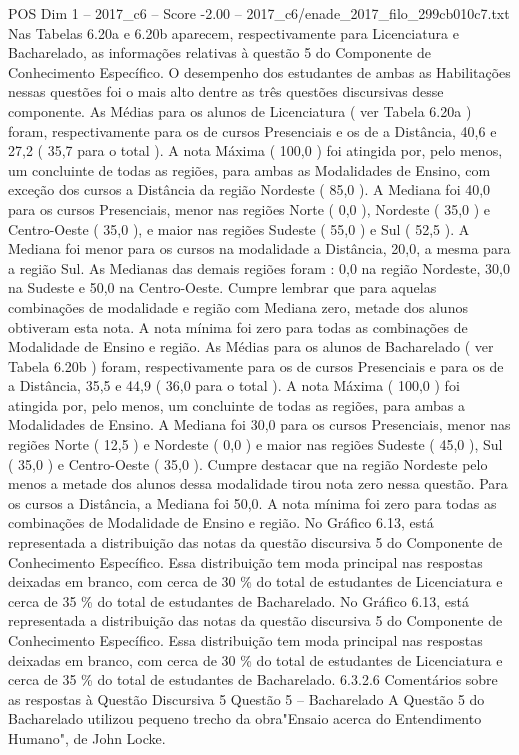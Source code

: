 \begin{textsample}{POS Dim 1 – 2017\_c6 – Score -2.00 – 2017\_c6/enade\_2017\_filo\_299cb010c7.txt}
Nas Tabelas 6.20a e 6.20b aparecem, respectivamente para Licenciatura e Bacharelado, as informações relativas à questão 5 do Componente de Conhecimento Específico.
O desempenho dos estudantes de ambas as Habilitações nessas questões foi o mais alto dentre as três questões discursivas desse componente.
As Médias para os alunos de Licenciatura ( ver Tabela 6.20a ) foram, respectivamente para os de cursos Presenciais e os de a Distância, 40,6 e 27,2 ( 35,7 para o total ).
A nota Máxima ( 100,0 ) foi atingida por, pelo menos, um concluinte de todas as regiões, para ambas as Modalidades de Ensino, com exceção dos cursos a Distância da região Nordeste ( 85,0 ).
A Mediana foi 40,0 para os cursos Presenciais, menor nas regiões Norte ( 0,0 ), Nordeste ( 35,0 ) e Centro-Oeste ( 35,0 ), e maior nas regiões Sudeste ( 55,0 ) e Sul ( 52,5 ).
A Mediana foi menor para os cursos na modalidade a Distância, 20,0, a mesma para a região Sul.
As Medianas das demais regiões foram : 0,0 na região Nordeste, 30,0 na Sudeste e 50,0 na Centro-Oeste.
Cumpre lembrar que para aquelas combinações de modalidade e região com Mediana zero, metade dos alunos obtiveram esta nota.
A nota mínima foi zero para todas as combinações de Modalidade de Ensino e região.
As Médias para os alunos de Bacharelado ( ver Tabela 6.20b ) foram, respectivamente para os de cursos Presenciais e para os de a Distância, 35,5 e 44,9 ( 36,0 para o total ).
A nota Máxima ( 100,0 ) foi atingida por, pelo menos, um concluinte de todas as regiões, para ambas a Modalidades de Ensino.
A Mediana foi 30,0 para os cursos Presenciais, menor nas regiões Norte ( 12,5 ) e Nordeste ( 0,0 ) e maior nas regiões Sudeste ( 45,0 ), Sul ( 35,0 ) e Centro-Oeste ( 35,0 ).
Cumpre destacar que na região Nordeste pelo menos a metade dos alunos dessa modalidade tirou nota zero nessa questão.
Para os cursos a Distância, a Mediana foi 50,0.
A nota mínima foi zero para todas as combinações de Modalidade de Ensino e região.
No Gráfico 6.13, está representada a distribuição das notas da questão discursiva 5 do Componente de Conhecimento Específico.
Essa distribuição tem moda principal nas respostas deixadas em branco, com cerca de 30 \% do total de estudantes de Licenciatura e cerca de 35 \% do total de estudantes de Bacharelado.
No Gráfico 6.13, está representada a distribuição das notas da questão discursiva 5 do Componente de Conhecimento Específico.
Essa distribuição tem moda principal nas respostas deixadas em branco, com cerca de 30 \% do total de estudantes de Licenciatura e cerca de 35 \% do total de estudantes de Bacharelado. 6.3.2.6 Comentários sobre as respostas à Questão Discursiva 5 Questão 5 – Bacharelado A Questão 5 do Bacharelado utilizou pequeno trecho da obra"Ensaio acerca do Entendimento Humano", de John Locke.

\end{textsample}
